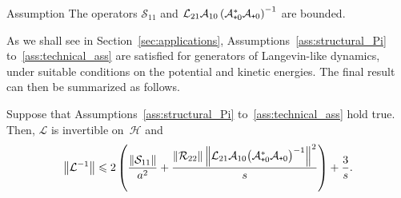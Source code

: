 \documentclass[AHL,Unicode,longabstracts,MathTools,published]{cedram}
\newcommand{\cL}{\mathcal{L}}
\newcommand{\cLs}{\mathcal{S}}
\newcommand{\cLa}{\mathcal{A}}
\newcommand{\cR}{\mathcal{R}}
\newcommand{\cH}{\mathcal{H}}
\newcommand{\subplus}{\textnormal{\texttt{+}}}
\renewcommand{\leq}{\leqslant}
\begin{document}
\begin{enonce}{Assumption}\label{ass:technical_ass}
The operators $\cLs_{11}$ and $\cL_{21}\cLa_{10}\left(\cLa_{\subplus0}^* \cLa_{\subplus0}\right)^{-1}$ are bounded.
\end{enonce}

As we shall see in Section~\ref{sec:applications}, Assumptions~\ref{ass:structural_Pi} to~\ref{ass:technical_ass} are satisfied for generators of Langevin-like dynamics, under suitable conditions on the potential and kinetic energies. The final result can then be summarized as follows.

\begin{theo}\label{thm:bounds_Linv}
Suppose that Assumptions~\ref{ass:structural_Pi} to~\ref{ass:technical_ass} hold true. Then, $\cL$ is invertible on~$\cH$ and
\[
\left\|\cL^{-1}\right\| \leq 2\left(\frac {\left\|\cLs_{11}\right\|} {a^{2}} + \frac {\left\|\cR_{22}\right\|\left\|\cL_{21}\cLa_{10}\big(\cLa_{\subplus0}^{*}\cLa_{\subplus0}\big)^{-1}\right\|^{2}}{s} \right) + \frac3s.
\]
\end{theo}
\end{document}
